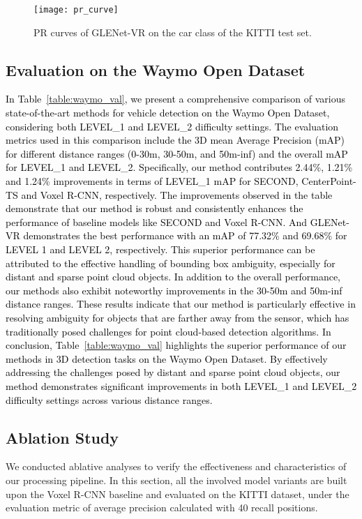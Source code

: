\documentclass[twocolumn]{svjour3}
\newcommand{\revise}[1]{\textcolor{black}{#1}}
\begin{document}
\begin{figure}[t]
	\centering
	\texttt{[image: pr\_curve]}
	\caption{PR curves of GLENet-VR on the car class of the KITTI test set.
	}
	\label{fig:pr_curve}
\end{figure}

\subsection{Evaluation on the Waymo Open Dataset} \label{exp_on_waymo}
\revise{
In Table~\ref{table:waymo_val}, we present a comprehensive comparison of various state-of-the-art methods for vehicle detection on the Waymo Open Dataset, considering both LEVEL\_1 and LEVEL\_2 difficulty settings. 
The evaluation metrics used in this comparison include the 3D mean Average Precision (mAP) for different distance ranges (0-30m, 30-50m, and 50m-inf) and the overall mAP for LEVEL\_1 and LEVEL\_2.
Specifically, our method contributes 2.44\%, 1.21\% and 1.24\% improvements in terms of LEVEL\_1 mAP for SECOND, CenterPoint-TS and Voxel R-CNN, respectively. The improvements observed in the table demonstrate that our method is robust and consistently enhances the performance of baseline models like SECOND and Voxel R-CNN.
And GLENet-VR demonstrates the best performance with an mAP of 77.32\% and 69.68\% for LEVEL 1 and LEVEL 2, respectively. This superior performance can be attributed to the effective handling of bounding box ambiguity, especially for distant and sparse point cloud objects.
In addition to the overall performance, our methods also exhibit noteworthy improvements in the 30-50m and 50m-inf distance ranges. These results indicate that our method is particularly effective in resolving ambiguity for objects that are farther away from the sensor, which has traditionally posed challenges for point cloud-based detection algorithms.
In conclusion, Table~\ref{table:waymo_val} highlights the superior performance of our methods in 3D detection tasks on the Waymo Open Dataset. By effectively addressing the challenges posed by distant and sparse point cloud objects, our method demonstrates significant improvements in both LEVEL\_1 and LEVEL\_2 difficulty settings across various distance ranges.}

\subsection{Ablation Study} \label{ablation_study}
We conducted ablative analyses to verify the effectiveness and characteristics of our processing pipeline. In this section, all the involved model variants are built upon the Voxel R-CNN baseline and evaluated on the KITTI dataset, under the evaluation metric of average precision calculated with 40 recall positions.
\end{document}
